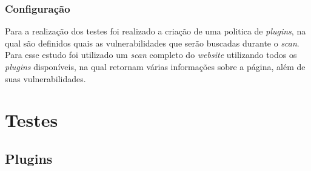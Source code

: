 \documentclass[
	12pt,				%
	openright,			%
	twoside,			%
	a4paper,			%
	english,			%
	french,				%
	spanish,			%
	brazil				%
	]{abntex2}
\begin{document}
\section{Configuração}
Para a realização dos testes foi realizado a criação de uma politica de \textit{plugins}, na qual são definidos quais as vulnerabilidades que serão buscadas durante o \textit{scan}.
\\Para esse estudo foi utilizado um \textit{scan} completo do \textit{website} utilizando todos os \textit{plugins} disponíveis, na qual retornam várias informações sobre a página, além de suas vulnerabilidades.

\part{Testes}
\chapter{Plugins}
\end{document}
